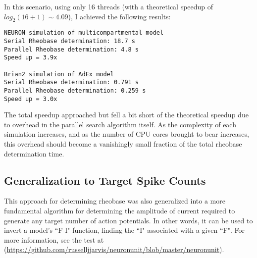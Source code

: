In this scenario, using only 16 threads (with a theoretical speedup of $log_2(16+1) \sim 4.09$), I achieved the following results:
\begin{verbatim}
NEURON simulation of multicompartmental model
Serial Rheobase determination: 18.7 s
Parallel Rheobase determination: 4.8 s
Speed up = 3.9x

Brian2 simulation of AdEx model
Serial Rheobase determination: 0.791 s
Parallel Rheobase determination: 0.259 s
Speed up = 3.0x
\end{verbatim}

The total speedup approached but fell a bit short of the theoretical speedup due to overhead in the parallel search algorithm itself.
As the complexity of each simulation increases, and as the number of CPU cores brought to bear increases, this overhead should become a vanishingly small fraction of the total rheobase determination time.

\subsection{Generalization to Target Spike Counts}
This approach for determining rheobase was also generalized into a more fundamental algorithm for determining the amplitude of current required to generate any target number of action potentials.
In other words, it can be used to invert a model's ``F-I" function, finding the ``I" associated with a given ``F". For more information, see the test at (\url{https://github.com/russelljjarvis/neuronunit/blob/master/neuronunit}).

